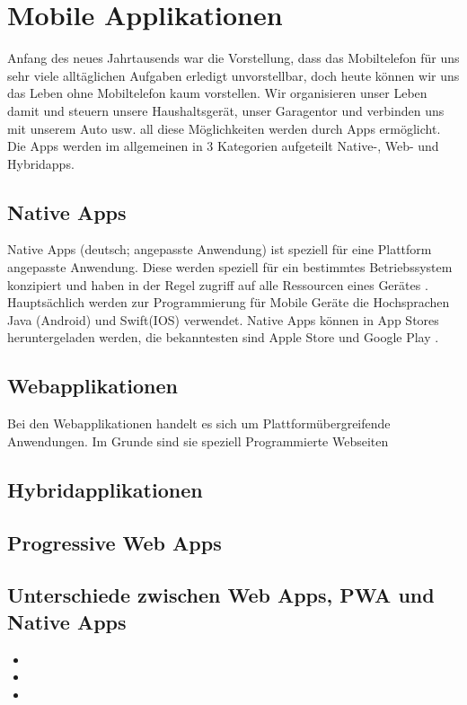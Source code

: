 \newpage

\section{Mobile Applikationen}
Anfang des neues Jahrtausends war die Vorstellung, dass das Mobiltelefon für uns sehr viele alltäglichen Aufgaben erledigt unvorstellbar, doch heute können wir uns das Leben ohne 
Mobiltelefon kaum vorstellen.
Wir organisieren unser Leben damit und steuern unsere Haushaltsgerät, unser Garagentor und verbinden uns mit unserem Auto usw. all diese Möglichkeiten werden durch Apps ermöglicht.
Die Apps werden im allgemeinen in 3 Kategorien aufgeteilt
Native-, Web- und Hybridapps. 

\subsection{Native Apps}
Native Apps (deutsch; angepasste Anwendung) ist speziell für eine Plattform angepasste Anwendung. 
Diese werden speziell für ein bestimmtes Betriebssystem konzipiert und haben in der Regel zugriff auf alle Ressourcen eines Gerätes \cite{NativeApp}.
Hauptsächlich werden zur Programmierung für Mobile Geräte die Hochsprachen Java (Android) und Swift(IOS) verwendet. Native Apps können in App Stores heruntergeladen  werden, die bekanntesten sind Apple Store und Google Play \cite{Hochsprachen}.

\subsection{Webapplikationen}
Bei den Webapplikationen handelt es sich um Plattformübergreifende Anwendungen. 
Im Grunde sind sie speziell Programmierte Webseiten \cite{Hochsprachen} 

\subsection{Hybridapplikationen}


\subsection{Progressive Web Apps}


\subsection{Unterschiede zwischen Web Apps, PWA und Native Apps}

\newpage

\begin{itemize}
    \item 
	\item 
	\item 
\end{itemize}

